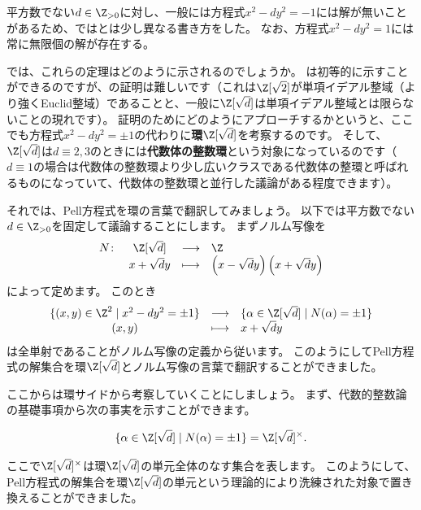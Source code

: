 \documentclass[11pt,b5paper,oneside,titlepage,lualatex]{ltjsreport}
\begin{document}
\begin{remark}{}{}
	平方数でない$ d \in \Z_{>0} $に対し、一般には方程式$ x^2 - dy^2 = -1 $には解が無いことがあるため、ではとは少し異なる書き方をした。
	なお、方程式$ x^2 - dy^2 = 1 $には常に無限個の解が存在する。
\end{remark}

では、これらの定理はどのように示されるのでしょうか。
は初等的に示すことができるのですが、の証明は難しいです（これは$ \Z[\sqrt{2}] $が単項イデアル整域（より強くEuclid整域）であることと、一般に$ \Z[\sqrt{d}] $は単項イデアル整域とは限らないことの現れです）。
証明のためにどのようにアプローチするかというと、ここでも方程式$ x^2 - dy^2 = \pm 1 $の代わりに\textbf{環}$ \Z[\sqrt{d}] $を考察するのです。
そして、$ \Z[\sqrt{d}] $は$ d \equiv 2, 3 $のときには\textbf{代数体の整数環}という対象になっているのです（$ d \equiv 1 $の場合は代数体の整数環より少し広いクラスである代数体の整環と呼ばれるものになっていて、代数体の整数環と並行した議論がある程度できます）。

それでは、Pell方程式を環の言葉で翻訳してみましょう。
以下では平方数でない$ d \in \Z_{>0} $を固定して議論することにします。
まずノルム写像を
\[
\begin{array}{cccl}
	N \colon & \Z[\sqrt{d}] & \longrightarrow & \Z \\
	& x + \sqrt{d}y & \longmapsto & \left(x - \sqrt{d}y \right) \left(x + \sqrt{d}y \right)
\end{array}
\]
によって定めます。
このとき
\[
\begin{array}{ccl}
	\{ (x, y) \in \Z^2 \mid x^2 - dy^2 = \pm 1 \} & \longrightarrow & \{ \alpha \in \Z[\sqrt{d}] \mid N(\alpha) = \pm 1 \} \\
	(x, y) & \longmapsto & x + \sqrt{d}y
\end{array}
\]
は全単射であることがノルム写像の定義から従います。
このようにしてPell方程式の解集合を環$ \Z[\sqrt{d}] $とノルム写像の言葉で翻訳することができました。

ここからは環サイドから考察していくことにしましょう。
まず、代数的整数論の基礎事項から次の事実を示すことができます。

\begin{lemma}{}{}
	\[
	\{ \alpha \in \Z[\sqrt{d}] \mid N(\alpha) = \pm 1 \}
	= \Z[\sqrt{d}]^\times.
	\]
\end{lemma}

ここで$ \Z[\sqrt{d}]^\times $は環$ \Z[\sqrt{d}] $の単元全体のなす集合を表します。
このようにして、Pell方程式の解集合を環$ \Z[\sqrt{d}] $の単元という理論的により洗練された対象で置き換えることができました。
\end{document}
